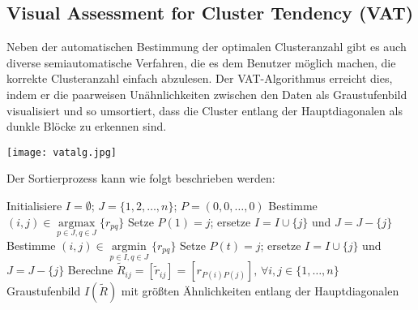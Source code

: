 \documentclass[11pt,ceqn]{book}
\DeclareMathOperator*{\argmax}{argmax}
\DeclareMathOperator*{\argmin}{argmin}
\begin{document}
\subsection{Visual Assessment for Cluster Tendency (VAT)}
\begin{minipage}{0.35\textwidth}\raggedright
Neben der automatischen Bestimmung der optimalen Clusteranzahl gibt es auch diverse semiautomatische Verfahren, die es dem Benutzer möglich machen, die korrekte Clusteranzahl einfach abzulesen. Der VAT-Algorithmus erreicht dies, indem er die paarweisen Unähnlichkeiten zwischen den Daten als Graustufenbild visualisiert und so umsortiert, dass die Cluster entlang der Hauptdiagonalen als dunkle Blöcke zu erkennen sind.
\end{minipage}
\hfill
\begin{minipage}{0.6\textwidth}
\texttt{[image: vatalg.jpg]}
\end{minipage}
 
\vspace{\belowdisplayskip}

Der Sortierprozess kann wie folgt beschrieben werden:
\begin{algorithm}[H]
\caption{$VAT(R)$}\label{vatalg}
\begin{algorithmic}[1]
\State Initialisiere $I=\emptyset$; $J=\{1,2,\dots,n\}$; $P = (0,0,\dots,0)$
\State Bestimme $(i,j)\in \argmax\limits_{p\in J, q\in J}\{r_{pq}\}$
\State Setze $P(1)=j$; ersetze $I = I \cup \{j\}$ und $J = J - \{j\}$
\State Bestimme $(i,j) \in \argmin\limits_{p\in I, q\in J}\{r_{pq}\}$
\State Setze $P(t) = j$; ersetze $I = I \cup \{j\}$ und $J = J - \{j\}$
\EndFor
\State Berechne $\tilde{R}_{ij} = \left[\tilde{r}_{ij}\right] = \left[r_{P(i)P(j)}\right],\, \forall i,j \in \{1,\dots,n\}$
\State \Return Graustufenbild $I(\tilde{R})$ mit größten Ähnlichkeiten entlang der Hauptdiagonalen
\end{algorithmic}
\end{algorithm}
\end{document}
